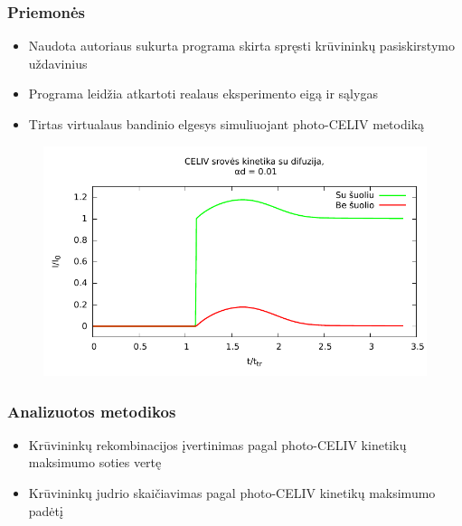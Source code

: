 \documentclass{beamer}
\begin{document}
  \begin{frame}
    \frametitle{Priemonės}
    \begin{itemize}
	\item Naudota autoriaus sukurta programa skirta spręsti krūvininkų pasiskirstymo uždavinius
	\item Programa leidžia atkartoti realaus eksperimento eigą ir sąlygas 
	\item Tirtas virtualaus bandinio elgesys simuliuojant photo-CELIV metodiką
	\end{itemize}    
	\begin{figure}
\centering
\includegraphics[height=0.5\textheight]{./media/pdf/jump.pdf} 
\end{figure}
  \end{frame}
  \begin{frame}
  	\frametitle{Analizuotos metodikos}
  	\begin{itemize}
  	\item Krūvininkų rekombinacijos įvertinimas pagal photo-CELIV kinetikų maksimumo soties vertę
  	\item Krūvininkų judrio skaičiavimas pagal photo-CELIV kinetikų maksimumo padėtį
  	\end{itemize}
  	\begin{figure}
    \centering
\end{figure}
  \end{frame}
  
\end{document}
